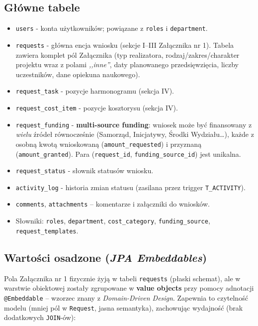 \documentclass[12pt,a4paper]{article}
\begin{document}
\subsection{Główne tabele}
\begin{itemize}[leftmargin=*]
  \item \texttt{users} - konta użytkowników; powiązane z \texttt{roles} i \texttt{department}.
  \item \texttt{requests} - główna encja wniosku (sekcje I--III Załącznika nr 1).
        Tabela zawiera komplet pól Załącznika (typ realizatora, rodzaj/zakres/charakter
        projektu wraz z polami \emph{,,inne''}, daty planowanego przedsięwzięcia,
        liczby uczestników, dane opiekuna naukowego).
  \item \texttt{request\_task} - pozycje harmonogramu (sekcja IV).
  \item \texttt{request\_cost\_item} - pozycje kosztorysu (sekcja IV).
  \item \texttt{request\_funding} - \textbf{multi-source funding}: wniosek może
        być finansowany z \emph{wielu} źródeł równocześnie (Samorząd, Inicjatywy,
        Środki Wydziału\ldots), każde z osobną kwotą wnioskowaną
        (\texttt{amount\_requested}) i przyznaną (\texttt{amount\_granted}).
        Para (\texttt{request\_id}, \texttt{funding\_source\_id}) jest unikalna.
  \item \texttt{request\_status} - słownik statusów wniosku.
  \item \texttt{activity\_log} - historia zmian statusu (zasilana przez trigger \texttt{T\_ACTIVITY}).
  \item \texttt{comments}, \texttt{attachments} -- komentarze i załączniki do wniosków.
  \item Słowniki: \texttt{roles}, \texttt{department}, \texttt{cost\_category},
        \texttt{funding\_source}, \texttt{request\_templates}.
\end{itemize}

\subsection{Wartości osadzone (\emph{JPA Embeddables})}
Pola Załącznika nr 1 fizycznie żyją w tabeli \texttt{requests} (płaski schemat),
ale w warstwie obiektowej zostały zgrupowane w \textbf{value objects} przy
pomocy adnotacji \texttt{@Embeddable} -- wzorzec znany z \emph{Domain-Driven
Design}. Zapewnia to czytelność modelu (mniej pól w \texttt{Request}, jasna
semantyka), zachowując wydajność (brak dodatkowych \texttt{JOIN}-ów):
\end{document}
